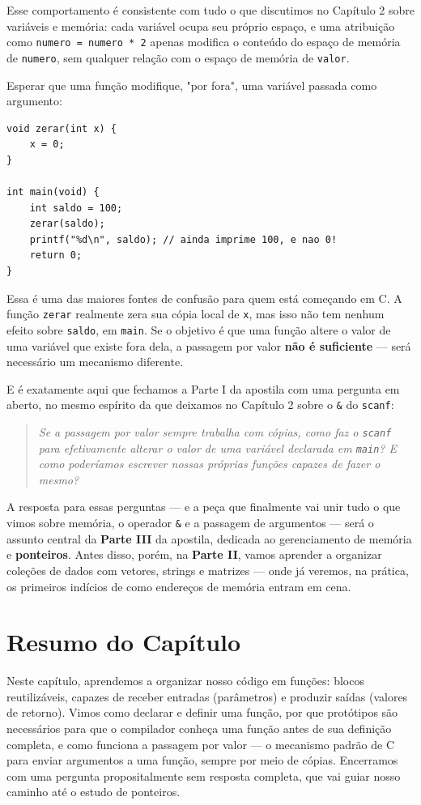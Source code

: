 Esse comportamento é consistente com tudo o que discutimos no Capítulo 2 sobre variáveis e memória: cada variável ocupa seu próprio espaço, e uma atribuição como \texttt{numero = numero * 2} apenas modifica o conteúdo do espaço de memória de \texttt{numero}, sem qualquer relação com o espaço de memória de \texttt{valor}.

\begin{errocomum}
Esperar que uma função modifique, "por fora", uma variável passada como argumento:
\begin{lstlisting}
void zerar(int x) {
    x = 0;
}

int main(void) {
    int saldo = 100;
    zerar(saldo);
    printf("%d\n", saldo); // ainda imprime 100, e nao 0!
    return 0;
}
\end{lstlisting}
Essa é uma das maiores fontes de confusão para quem está começando em C. A função \texttt{zerar} realmente zera sua cópia local de \texttt{x}, mas isso não tem nenhum efeito sobre \texttt{saldo}, em \texttt{main}. Se o objetivo é que uma função altere o valor de uma variável que existe fora dela, a passagem por valor \textbf{não é suficiente} — será necessário um mecanismo diferente.
\end{errocomum}

E é exatamente aqui que fechamos a Parte I da apostila com uma pergunta em aberto, no mesmo espírito da que deixamos no Capítulo 2 sobre o \texttt{\&} do \texttt{scanf}:

\begin{quote}
\textit{Se a passagem por valor sempre trabalha com cópias, como faz o \texttt{scanf} para efetivamente alterar o valor de uma variável declarada em \texttt{main}? E como poderíamos escrever nossas próprias funções capazes de fazer o mesmo?}
\end{quote}

A resposta para essas perguntas — e a peça que finalmente vai unir tudo o que vimos sobre memória, o operador \texttt{\&} e a passagem de argumentos — será o assunto central da \textbf{Parte III} da apostila, dedicada ao gerenciamento de memória e \textbf{ponteiros}. Antes disso, porém, na \textbf{Parte II}, vamos aprender a organizar coleções de dados com vetores, strings e matrizes — onde já veremos, na prática, os primeiros indícios de como endereços de memória entram em cena.

\section*{Resumo do Capítulo}
Neste capítulo, aprendemos a organizar nosso código em funções: blocos reutilizáveis, capazes de receber entradas (parâmetros) e produzir saídas (valores de retorno). Vimos como declarar e definir uma função, por que protótipos são necessários para que o compilador conheça uma função antes de sua definição completa, e como funciona a passagem por valor — o mecanismo padrão de C para enviar argumentos a uma função, sempre por meio de cópias. Encerramos com uma pergunta propositalmente sem resposta completa, que vai guiar nosso caminho até o estudo de ponteiros.

